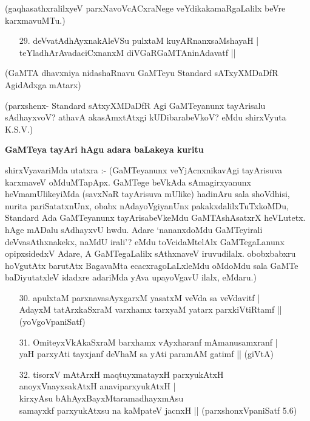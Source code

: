 (gaqhasathxralilxyeV parxNavoVcACxraNege veYdikakamaRgaLalilx beVre karxmavuMTu.)

\begin{itemize}
\item[29.] deVvatAdhAyxnakAleVSu pulxtaM kuyARnanxsaMshayaH |\\\label{148}
teYladhArAvadaciCxnanxM diVGaRGaMTAninAdavatf ||
\end{itemize}

(GaMTA dhavxniya nidashaRnavu GaMTeyu {\rm Standard} sATxyXMDaDfR AgidAdxga mAtarx)

(parxshenx- {\rm Standard} sAtxyXMDaDfR Agi GaMTeyanunx tayArisalu sAdhayxvoV? athavA akasAmxtAtxgi kUDibarabeVkoV? eMdu shirxVyuta {\rm K.S.V.})

\noindent
{\bf\large{GaMTeya tayAri hAgu adara baLakeya kuritu}}\label{page170}

shirxVyavariMda utatxra :- (GaMTeyanunx veYjAcnxnikavAgi tayArisuva karxmaveV oMduMTapApx. GaMTege beVkAda sAmagirxyanunx heVmamUlikeyiMda (savxNaR tayArisuva mUlike) hadinAru sala shoVdhisi, nurita pariSatatxnUnx, obabx nAdayoVgiyanUnx pakakxdalilxTuTxkoMDu, {\rm Standard} Ada GaMTeyanunx tayArisabeVkeMdu GaMTAshAsatxrX heVLutetx. hAge mADalu sAdhayxvU hwdu. Adare `nananxdoMdu GaMTeyirali deVvasAthxnakekx, naMdU irali'? eMdu toVcidaMtelAlx GaMTegaLanunx opipxsidedxV Adare, A GaMTegaLalilx sAthxnaveV iruvudilalx. obobxbabxru hoVgutAtx barutAtx BagavaMta ecacxragoLaLxleMdu oMdoMdu sala GaMTe baDiyutatxleV idadxre adariMda yAva upayoVgavU ilalx, eMdaru.)

\begin{itemize}
\item[30.] apulxtaM parxnavasAyxgarxM yasatxM veVda sa veVdavitf |\\\label{148}
AdayxM tatArxkaSxraM varxhamx tarxyaM yatarx parxkiVtiRtamf ||
\hfill{(yoVgoVpaniSatf)}
\item[31.] OmiteyxVkAkaSxraM barxhamx vAyxharanf mAmanusamxranf |\\\label{148}
yaH parxyAti tayxjanf deVhaM sa yAti paramAM gatimf ||
\hfill{(giVtA)}
\item[32.] tisorxV mAtArxH maqtuyxmatayxH parxyukAtxH\\\label{148}
anoyxVnayxsakAtxH anaviparxyukAtxH |\\
kirxyAsu bAhAyxBayxMtaramadhayxmAsu\\
samayxkf parxyukAtxsu na kaMpateV jacnxH ||
\hfill{(parxshonxVpaniSatf 5.6)}
\end{itemize}

